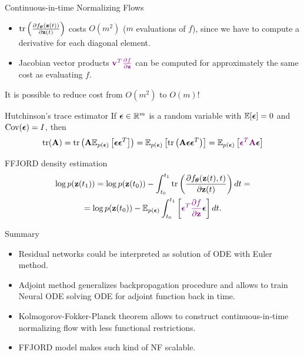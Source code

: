 \begin{frame}{Continuous-in-time Normalizing Flows}
	\vspace{0.2cm}
	\begin{itemize}
		\item $\text{tr} \left( \frac{\partial f_{\boldsymbol{\theta}}(\mathbf{z}(t))}{\partial \mathbf{z}(t)} \right)$ costs $O(m^2)$ ($m$
		evaluations of $f$), since we have to compute a derivative for each diagonal element. 
		\item Jacobian vector products ${\color{violet}\mathbf{v}^T \frac{\partial f}{\partial \mathbf{z}}}$ can be computed for approximately the same cost as evaluating $f$.
	\end{itemize}
	It is possible to reduce cost from $O(m^2)$ to $O(m)$!
	\begin{block}{Hutchinson's trace estimator}
		If $\boldsymbol{\epsilon} \in \mathbb{R}^m$ is a random variable with $\mathbb{E} [\boldsymbol{\epsilon}] = 0$ and $\text{Cov} (\boldsymbol{\epsilon}) = I$, then
		\vspace{-0.3cm}
		\[
		    \text{tr}(\mathbf{A}) = \text{tr}\left(\mathbf{A}\mathbb{E}_{p(\boldsymbol{\epsilon})} \left[ \boldsymbol{\epsilon} \boldsymbol{\epsilon}^T \right]\right) =  \mathbb{E}_{p(\boldsymbol{\epsilon})} \left[  \text{tr}\left(  \mathbf{A}  \boldsymbol{\epsilon} \boldsymbol{\epsilon}^T \right) \right] =  \mathbb{E}_{p(\boldsymbol{\epsilon})} \left[ {\color{violet} \boldsymbol{\epsilon}^T \mathbf{A}} \boldsymbol{\epsilon}  \right]
		\]
		\vspace{-0.6 cm}
	\end{block}
	\begin{block}{FFJORD density estimation}
		\vspace{-0.8cm}
		\begin{multline*}
		    \log p(\mathbf{z}(t_1)) = \log p(\mathbf{z}(t_0)) - \int_{t_0}^{t_1} \text{tr}  \left( \frac{\partial f_{\boldsymbol{\theta}}(\mathbf{z}(t), t)}{\partial \mathbf{z}(t)} \right) dt = \\ = \log p(\mathbf{z}(t_0)) - \mathbb{E}_{p(\boldsymbol{\epsilon})} \int_{t_0}^{t_1} \left[ {\color{violet}\boldsymbol{\epsilon}^T \frac{\partial f}{\partial \mathbf{z}}} \boldsymbol{\epsilon} \right] dt.
		\end{multline*}
	\end{block}
\end{frame}
\begin{frame}{Summary}
	\begin{itemize}
		\item Residual networks could be interpreted as solution of ODE with Euler method.
		\vfill
		\item Adjoint method generalizes backpropagation procedure and allows to train Neural ODE solving ODE for adjoint function back in time.
		\vfill
		\item Kolmogorov-Fokker-Planck theorem allows to construct continuous-in-time normalizing flow with less functional restrictions.
		\vfill
		\item FFJORD model makes such kind of NF scalable.
	\end{itemize}
\end{frame}
 